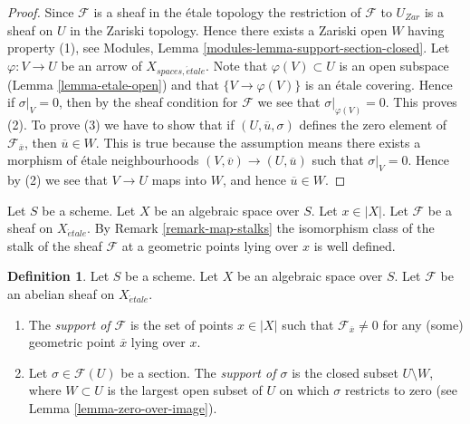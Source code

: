 \documentclass{stacks-project}
\theoremstyle{plain}
\theoremstyle{definition}
\newtheorem{definition}[subsection]{Definition}
\theoremstyle{remark}
\numberwithin{equation}{subsection}
\def\etale{{\acute{e}tale}}
\begin{document}
\begin{proof}
Since $\mathcal{F}$ is a sheaf in the \'etale topology the restriction of
$\mathcal{F}$ to $U_{Zar}$ is a sheaf on $U$ in the Zariski topology.
Hence there exists a Zariski open $W$ having property (1), see
Modules, Lemma \ref{modules-lemma-support-section-closed}. Let
$\varphi : V \to U$ be an arrow of $X_{spaces, \etale}$. Note that
$\varphi(V) \subset U$ is an open subspace
(Lemma \ref{lemma-etale-open})
and that $\{V \to \varphi(V)\}$ is an \'etale covering. Hence if
$\sigma|_V = 0$, then by the sheaf condition for $\mathcal{F}$ we
see that $\sigma|_{\varphi(V)} = 0$. This proves (2).
To prove (3) we have to show that if $(U, \overline{u}, \sigma)$
defines the zero element of $\mathcal{F}_{\overline{x}}$, then
$\overline{u} \in W$. This is true because the assumption means
there exists a morphism of \'etale neighbourhoods
$(V, \overline{v}) \to (U, \overline{u})$ such that
$\sigma|_V = 0$. Hence by (2) we see that $V \to U$ maps into $W$, and
hence $\overline{u} \in W$.
\end{proof}

\noindent
Let $S$ be a scheme.
Let $X$ be an algebraic space over $S$.
Let $x \in |X|$.
Let $\mathcal{F}$ be a sheaf on $X_\etale$. By
Remark \ref{remark-map-stalks}
the isomorphism class of the stalk of the sheaf $\mathcal{F}$
at a geometric points lying over $x$ is well defined.

\begin{definition}
\label{definition-support}
Let $S$ be a scheme.
Let $X$ be an algebraic space over $S$.
Let $\mathcal{F}$ be an abelian sheaf on $X_\etale$.
\begin{enumerate}
\item The {\it support of $\mathcal{F}$} is the set of
points $x \in |X|$ such that $\mathcal{F}_{\overline{x}} \not = 0$
for any (some) geometric point $\overline{x}$ lying over $x$.
\item Let $\sigma \in \mathcal{F}(U)$ be a section.
The {\it support of $\sigma$} is the closed subset $U \setminus W$, where
$W \subset U$ is the largest open subset of $U$ on which $\sigma$
restricts to zero (see
Lemma \ref{lemma-zero-over-image}).
\end{enumerate}
\end{definition}
\end{document}

